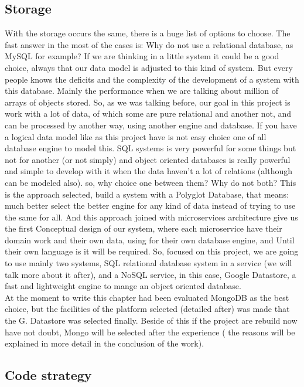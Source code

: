 \subsection{Storage}

With the storage occurs the same, there is a huge list of options to
choose. The fast answer in the most of the cases is: Why do not use a relational
database, as MySQL for example? If we are thinking in a little system
it could be a good choice, always that our data model is adjusted to this kind of system.
But every people knows the deficits and the complexity of the development of a system
with this database. Mainly the performance when we are talking about million
of arrays of objects stored. So, as we was talking before, our goal in this project
is work with a lot of data, of which some are pure relational and another not,
and can be processed by another way, using another engine and database.
\intro
If you have a logical data model like as this project have is not easy choice one
of all database engine to model this. SQL systems is very powerful for some
things but not for another (or not simply) and object oriented databases is
really powerful and simple to develop with it when the data haven't a lot of
relations (although can be modeled also).
so, why choice one between them? Why do not both? This is the approach selected,
build a system with a Polyglot Database, that means: much better select the better
engine for any kind of data instead of trying to use the same for all.
\intro
And this approach joined with microservices architecture give us the first
Conceptual design of our system, where each microservice have their domain work and their
own data, using for their own database engine, and
Until their own language is it will be required.
\intro
So, focused on this project, we are going to use mainly two systems, SQL
relational database system in a service (we will talk more about it after),
and a NoSQL service, in this case, Google Datastore, a fast and lightweight
engine to mange an object oriented database.
\intro
\\
At the moment to write this chapter had been evaluated MongoDB as the best
choice, but the facilities of the platform selected (detailed after) was made
that the G. Datastore was selected finally. Beside of this if the project are
rebuild now have not doubt, Mongo will be selected after the experience ( the
reasons will be explained in more detail in the conclusion of the work).

\subsection{Code strategy}

